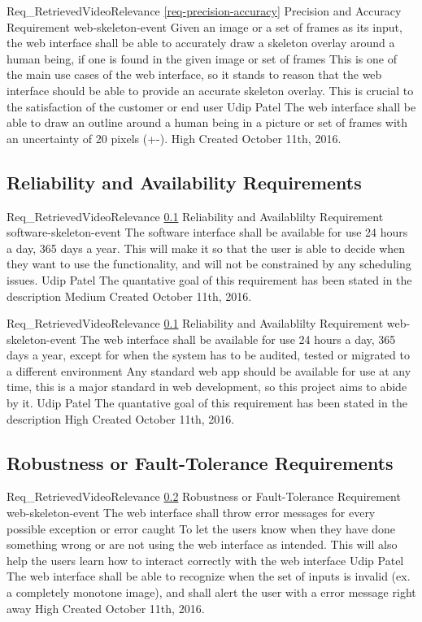 \documentclass{scrreprt}
\begin{document}
\requirement
{Req_RetrievedVideoRelevance}
{\ref{req-precision-accuracy} Precision and Accuracy Requirement}
{web-skeleton-event}
{Given an image or a set of frames as its input, the web interface shall be able to accurately draw a skeleton overlay around a human being, if one is found in the given image or set of frames}
{This is one of the main use cases of the web interface, so it stands to reason that the web interface should be able to provide an accurate skeleton overlay. This is crucial to the satisfaction of the customer or end user }
{Udip Patel}
{The web interface shall be able to draw an outline around a human being in a picture or set of frames with an uncertainty of 20 pixels (+-).}
{High}
{Created October 11th, 2016.}

\subsection{Reliability and Availability Requirements}
\label{req-reliability-availability}
\requirement
{Req_RetrievedVideoRelevance}
{\ref{req-reliability-availability} Reliability and Availablilty Requirement}
{software-skeleton-event}
{The software interface shall be available for use 24 hours a day, 365 days a year.}
{This will make it so that the user is able to decide when they want to use the functionality, and will not be constrained by any scheduling issues.}
{Udip Patel}
{The quantative goal of this requirement has been stated in the description}
{Medium}
{Created October 11th, 2016.}

\requirement
{Req_RetrievedVideoRelevance}
{\ref{req-reliability-availability} Reliability and Availablilty Requirement}
{web-skeleton-event}
{The web interface shall be available for use 24 hours a day, 365 days a year, except for when the system has to be audited, tested or migrated to a different environment}
{Any standard web app should be available for use at any time, this is a major standard in web development, so this project aims to abide by it.}
{Udip Patel}
{The quantative goal of this requirement has been stated in the description}
{High}
{Created October 11th, 2016.}

\subsection{Robustness or Fault-Tolerance Requirements}

\label{req-robustness}
\requirement
{Req_RetrievedVideoRelevance}
{\ref{req-robustness} Robustness or Fault-Tolerance Requirement}
{web-skeleton-event}
{The web interface shall throw error messages for every possible exception or error caught}
{To let the users know when they have done something wrong or are not using the web interface as intended. This will also help the users learn how to interact correctly with the web interface}
{Udip Patel}
{The web interface shall be able to recognize when the set of inputs is invalid (ex. a completely monotone image), and shall alert the user with a error message right away}
{High}
{Created October 11th, 2016.}
\end{document}
